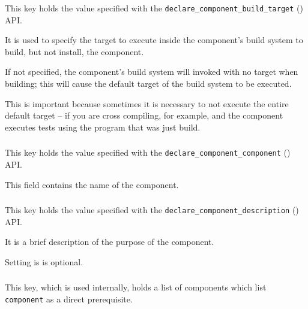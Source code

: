 This key holds the value specified with the
\texttt{declare\_component\_build\_target}
() API.

It is used to specify the target to execute inside the component's
build system to build, but not install, the component.

If not specified, the component's build system will invoked with no
target when building; this will cause the default target of the build
system to be executed.

This is important because sometimes it is necessary to not execute the
entire default target -- if you are cross compiling, for example, and
the component executes tests using the program that was just build.

\subsubsection{}


\subsubsection{}

This key holds the value specified with the
\texttt{declare\_component\_component} () API.

This field contains the name of the component.

\subsubsection{}

This key holds the value specified with the
\texttt{declare\_component\_description}
() API.

It is a brief description of the purpose of the component.

Setting is is optional.

\subsubsection{}

This key, which is used internally, holds a list of components which
list \texttt{component} as a direct prerequisite.

